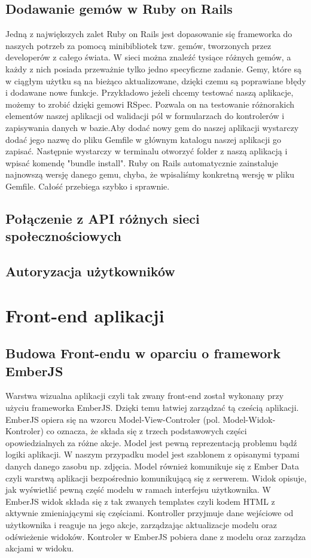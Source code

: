 \documentclass[brudnopis]{xmgr}
\begin{document}
\subsection{Dodawanie gemów w Ruby on Rails}
Jedną z największych zalet Ruby on Rails jest dopasowanie się frameworka do naszych potrzeb za pomocą minibibliotek tzw. gemów, tworzonych przez developerów z całego świata.
W sieci można znaleźć tysiące różnych gemów, a każdy z nich posiada przeważnie tylko jedno specyficzne zadanie. Gemy, które są w ciągłym użytku są na bieżąco aktualizowane, dzięki czemu są poprawiane błędy i dodawane nowe funkcje. Przykładowo jeżeli chcemy testować naszą aplikacje, możemy to zrobić dzięki gemowi RSpec. Pozwala on na testowanie różnorakich elementów naszej aplikacji od walidacji pól w formularzach do kontrolerów i zapisywania danych w bazie.\newline \indent Aby dodać nowy gem do naszej aplikacji wystarczy dodać jego nazwę do pliku Gemfile w głównym katalogu naszej aplikacji go zapisać. Następnie wystarczy w terminalu otworzyć folder z naszą aplikacją i wpisać komendę "bundle install". Ruby on Rails automatycznie zainstaluje najnowszą wersję danego gemu, chyba, że wpisaliśmy konkretną wersję w pliku Gemfile. Całość przebiega szybko i sprawnie.

\subsection{Połączenie z API różnych sieci społecznościowych}
\subsection{Autoryzacja użytkowników}

\section{Front-end aplikacji}

\subsection{Budowa Front-endu w oparciu o framework EmberJS }
Warstwa wizualna aplikacji czyli tak zwany front-end został wykonany przy użyciu frameworka EmberJS. Dzięki temu łatwiej zarządzać tą cześcią aplikacji. EmberJS opiera się na wzorcu Model-View-Controler (pol. Model-Widok-Kontroler) co oznacza, że składa się z
trzech podstawowych części opowiedzialnych za różne akcje. Model  jest pewną reprezentacją problemu bądź logiki aplikacji. W naszym przypadku model jest szablonem z opisanymi typami danych danego zasobu np. zdjęcia. Model również komunikuje się z Ember Data czyli warstwą aplikacji bezpośrednio komunikującą się z serwerem.  Widok opisuje, jak wyświetlić pewną część modelu w ramach interfejsu użytkownika. W EmberJS widok składa się z tak zwanych templates czyli kodem HTML z aktywnie zmieniającymi się częściami. Kontroller przyjmuje dane wejściowe od użytkownika i reaguje na jego akcje, zarządzając aktualizacje modelu oraz odświeżenie widoków. Kontroler w EmberJS pobiera dane z modelu oraz zarządza akcjami w widoku.
\end{document}

